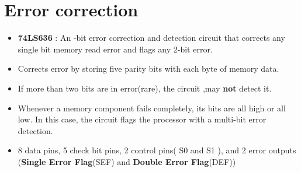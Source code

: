 \section{Error correction}
\begin{itemize}
  \item \textbf{74LS636} : An -bit error correction and detection circuit that corrects any single bit memory read error and flags any 2-bit error.
  \item Corrects error by storing five parity bits with each byte of memory data.
  \item If more than two bits are in error(rare), the circuit ,may \textbf{not} detect it.
  \item Whenever a memory component fails completely, its bits are all high or all low. In this case, the circuit flags the processor with a multi-bit error detection.
  \item 8 data pins, 5 check bit pins, 2 control pins( S0 and S1 ), and 2 error outputs (\textbf{Single Error Flag}(SEF) and \textbf{Double Error Flag}(DEF))
\end{itemize}

